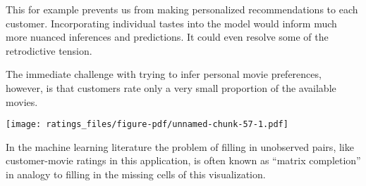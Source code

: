 \documentclass[
  letterpaper,
  DIV=11,
  numbers=noendperiod]{scrartcl}
\newenvironment{Shaded}{\begin{snugshade}}{\end{snugshade}}
\newcommand{\AttributeTok}[1]{\textcolor[rgb]{0.40,0.45,0.13}{#1}}
\newcommand{\ControlFlowTok}[1]{\textcolor[rgb]{0.00,0.23,0.31}{#1}}
\newcommand{\DecValTok}[1]{\textcolor[rgb]{0.68,0.00,0.00}{#1}}
\newcommand{\FunctionTok}[1]{\textcolor[rgb]{0.28,0.35,0.67}{#1}}
\newcommand{\NormalTok}[1]{\textcolor[rgb]{0.00,0.23,0.31}{#1}}
\newcommand{\OtherTok}[1]{\textcolor[rgb]{0.00,0.23,0.31}{#1}}
\newcommand{\SpecialCharTok}[1]{\textcolor[rgb]{0.37,0.37,0.37}{#1}}
\newcommand{\StringTok}[1]{\textcolor[rgb]{0.13,0.47,0.30}{#1}}
\begin{document}
This for example prevents us from making personalized recommendations to
each customer. Incorporating individual tastes into the model would
inform much more nuanced inferences and predictions. It could even
resolve some of the retrodictive tension.

The immediate challenge with trying to infer personal movie preferences,
however, is that customers rate only a very small proportion of the
available movies.

\begin{Shaded}
\end{Shaded}

\texttt{[image: ratings\_files/figure-pdf/unnamed-chunk-57-1.pdf]}

In the machine learning literature the problem of filling in unobserved
pairs, like customer-movie ratings in this application, is often known
as ``matrix completion'' in analogy to filling in the missing cells of
this visualization.
\end{document}
